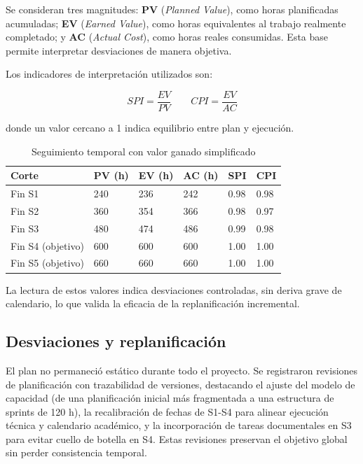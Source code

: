 Se consideran tres magnitudes: \textbf{PV} (\emph{Planned Value}), como horas planificadas acumuladas; \textbf{EV} (\emph{Earned Value}), como horas equivalentes al trabajo realmente completado; y \textbf{AC} (\emph{Actual Cost}), como horas reales consumidas. Esta base permite interpretar desviaciones de manera objetiva.

Los indicadores de interpretaci\'on utilizados son:

\[
SPI = \frac{EV}{PV}
\qquad
CPI = \frac{EV}{AC}
\]

donde un valor cercano a 1 indica equilibrio entre plan y ejecuci\'on.

\begin{table}[!htbp]
\centering
\begin{tabular}{|P{2cm}|P{2.2cm}|P{2.2cm}|P{2.2cm}|P{1.5cm}|P{1.5cm}|}
\hline
\textbf{Corte} & \textbf{PV (h)} & \textbf{EV (h)} & \textbf{AC (h)} & \textbf{SPI} & \textbf{CPI} \\
\hline
Fin S1 & 240 & 236 & 242 & 0.98 & 0.98 \\
\hline
Fin S2 & 360 & 354 & 366 & 0.98 & 0.97 \\
\hline
Fin S3 & 480 & 474 & 486 & 0.99 & 0.98 \\
\hline
Fin S4 (objetivo) & 600 & 600 & 600 & 1.00 & 1.00 \\
\hline
Fin S5 (objetivo) & 660 & 660 & 660 & 1.00 & 1.00 \\
\hline
\end{tabular}
\caption{Seguimiento temporal con valor ganado simplificado}
\label{tab:valor-ganado}
\end{table}

La lectura de estos valores indica desviaciones controladas,
sin deriva grave de calendario,
lo que valida la eficacia de la replanificaci\'on incremental.

\subsection{Desviaciones y replanificaci\'on}

El plan no permaneci\'o est\'atico durante todo el proyecto. Se registraron revisiones
de planificaci\'on con trazabilidad de versiones, destacando el ajuste del modelo de capacidad (de una planificaci\'on inicial m\'as fragmentada a una estructura de sprints de 120 h), la recalibraci\'on de fechas de S1-S4 para alinear ejecuci\'on t\'ecnica y calendario acad\'emico, y la incorporaci\'on de tareas documentales en S3 para evitar cuello de botella en S4. Estas revisiones preservan el objetivo global sin perder consistencia temporal.


